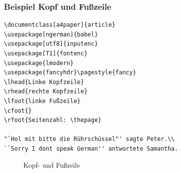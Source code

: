\begin{frame}[fragile]
\frametitle{Beispiel Kopf und Fußzeile}
\begin{minipage}{.6\textwidth}
{\scriptsize
\begin{lstlisting}[style=Latex]
\documentclass[a4paper]{article}
\usepackage[ngerman]{babel}
\usepackage[utf8]{inputenc}
\usepackage[T1]{fontenc}
\usepackage{lmodern}
\usepackage{fancyhdr}\pagestyle{fancy}
\lhead{Linke Kopfzeile}
\rhead{rechte Kopfzeile}
\lfoot{linke Fußzeile} 
\cfoot{}
\rfoot{Seitenzahl: \thepage}

"`Hol mit bitte die Rührschüssel"' sagte Peter.\\
``Sorry I dont speak German'' antwortete Samantha.

\end{lstlisting}}

\end{minipage}
\pause
\begin{minipage}{.39\textwidth}

\begin{figure}[htp]
\centering
{}
\vspace{-20pt}
\caption{Kopf- und Fußzeile}
\end{figure}

\end{minipage}
\end{frame}



